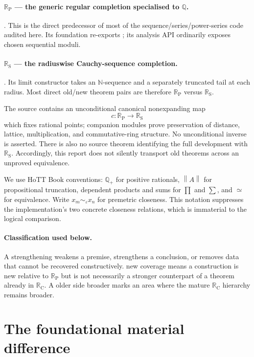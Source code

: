 \documentclass[11pt,a4paper]{article}
\newcommand{\N}{\mathbb{N}}
\newcommand{\Q}{\mathbb{Q}}
\newcommand{\Qp}{\mathbb{Q}_{+}}
\newcommand{\RC}{\mathbb{R}_{\mathrm C}}
\newcommand{\RP}{\mathbb{R}_{\mathrm P}}
\newcommand{\RS}{\mathbb{R}_{\mathrm S}}
\newcommand{\brck}[1]{\left\lVert #1\right\rVert}
\newcommand{\eqv}{\simeq}
\newcommand{\close}[1]{\mathrel{\sim_{#1}}}
\newcommand{\code}[1]{{\ttfamily\seqsplit{#1}}}
\newcommand{\strength}{\textcolor{deepblue}{\textsf{strengthening}}}
\newcommand{\newcov}{\textcolor{green!40!black}{\textsf{new coverage}}}
\newcommand{\gap}{\textcolor{red!55!black}{\textsf{older side broader}}}
\begin{document}
\paragraph{$\RP$ --- the generic regular completion specialised to $\Q$.}
  .  This is the direct predecessor of most of
  the sequence/series/power-series code audited here.  Its foundation re-exports
  ; its analysis API ordinarily exposes
  chosen sequential moduli.

\paragraph{$\RS$ --- the radiuswise Cauchy-sequence completion.}
  .  Its limit
  constructor takes an $\N$-sequence and a separately truncated tail at each
  radius.  Most direct old/new theorem pairs are therefore $\RP$ versus $\RS$.

The source contains an unconditional canonical nonexpanding map
\[
  c : \RP \longrightarrow \RS
\]
which fixes rational points; companion modules prove preservation of distance, lattice,
multiplication, and commutative-ring structure.  No unconditional inverse is asserted.
There is also no source theorem identifying the full \code{HITs/CauchyReals} development
with $\RS$.  Accordingly, this report does not silently transport old theorems across an
unproved equivalence.

We use HoTT Book conventions: $\Qp$ for positive rationals, $\brck{A}$ for propositional
truncation, dependent products and sums for $\prod$ and $\sum$, and $\eqv$ for equivalence.
Write $x_m\close{\varepsilon}x_n$ for premetric closeness.  This notation suppresses
the implementation's two concrete closeness relations, which is immaterial to the logical
comparison.

\paragraph{Classification used below.}
A \strength{} weakens a premise, strengthens a conclusion, or removes data that cannot be
recovered constructively.  \newcov{} means a construction is new relative to $\RP$ but is
not necessarily a stronger counterpart of a theorem already in $\RC$.  A \gap{} marks an
area where the mature $\RC$ hierarchy remains broader.

\section{The foundational material difference}
\end{document}
